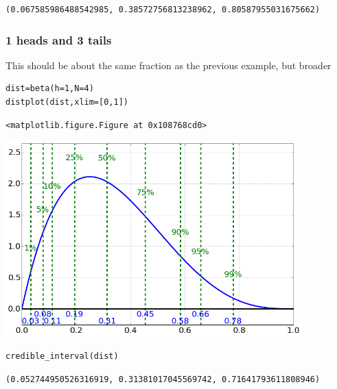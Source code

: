 \begin{verbatim}
(0.067585986488542985, 0.38572756813238962, 0.80587955031675662)
\end{verbatim}

\subsubsection{1 heads and 3 tails}


This should be about the same fraction as the previous example, but broader

\begin{lstlisting}
dist=beta(h=1,N=4)
distplot(dist,xlim=[0,1])
\end{lstlisting}

\begin{verbatim}
<matplotlib.figure.Figure at 0x108768cd0>\end{verbatim}

\begin{center}\includegraphics[width=4.5in]{Introduction_to_Parameter_Estimation/Introduction_to_Parameter_Estimation_fig1.png}\end{center}

\begin{lstlisting}
credible_interval(dist)
\end{lstlisting}

\begin{verbatim}
(0.052744950526316919, 0.31381017045569742, 0.71641793611808946)
\end{verbatim}

\begin{lstlisting}

\end{lstlisting}

